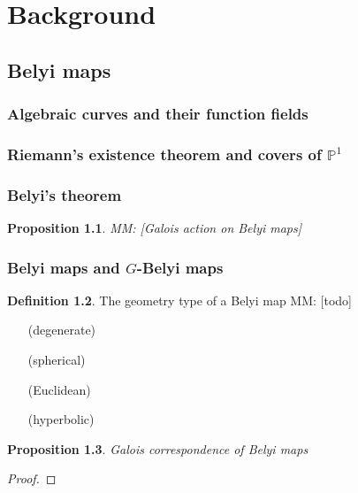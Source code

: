 \documentclass{dcthesis}
\newcommand{\PP}{\mathbb P}
\newcommand{\defi}[1]{\textsf{#1}}
\newcommand{\mm}[1]{{\color{blue} \sf MM: [#1]}}
\newtheorem{prop}{Proposition}[section]
\theoremstyle{definition}
\newtheorem{definition}[prop]{Definition}
\theoremstyle{remark}
\numberwithin{equation}{section}
\numberwithin{figure}{section}
\begin{document}
\chapter{Background}{\label{chapter:background}
  \section{Belyi maps}{\label{sec:belyimaps}
    \subsection{Algebraic curves and their function fields}{
    }
    \subsection{Riemann's existence theorem and covers of $\PP^1$}{
    }
    \subsection{Belyi's theorem}{
      \begin{prop}\label{prop:galoisaction}
        \mm{Galois action on Belyi maps}
      \end{prop}
    }
    \subsection{Belyi maps and $G$-Belyi maps}{\label{subsec:belyimaps}
      \begin{definition}\label{def:geometrytype}
        The \defi{geometry type} of a Belyi map
        \mm{todo}
        \begin{enumerate}
          \item[(degenerate)]
          \item[(spherical)]
          \item[(Euclidean)]
          \item[(hyperbolic)]
        \end{enumerate}
      \end{definition}
      \begin{prop}\label{prop:galoiscorrespondence}
        Galois correspondence of Belyi maps
      \end{prop}
      \begin{proof}
      \end{proof}
    }
}}
\end{document}
